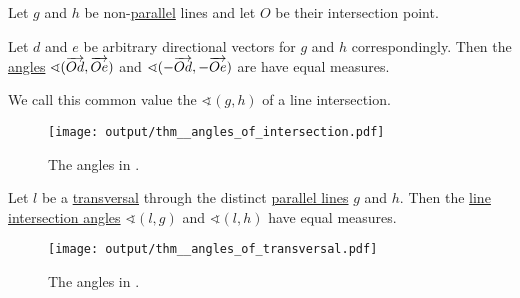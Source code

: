 \begin{definition}\label{thm:angles_of_intersection}
  Let \( g \) and \( h \) be non-\hyperref[def:affine_parallelism]{parallel} lines and let \( O \) be their intersection point.

  Let \( d \) and \( e \) be arbitrary directional vectors for \( g \) and \( h \) correspondingly. Then the \hyperref[def:angle/undirected]{ angles} \( \sphericalangle(\overrightarrow{Od}, \overrightarrow{Oe}) \) and \( \sphericalangle(-\overrightarrow{Od}, -\overrightarrow{Oe}) \) are have equal measures.

  We call this common value the  \( \sphericalangle(g, h) \) of a line intersection.

  \begin{figure}[!ht]
    \centering
    \texttt{[image: output/thm\_\_angles\_of\_intersection.pdf]}
    \caption{The angles in .}\label{fig:thm:angles_of_intersection}
  \end{figure}
\end{definition}

\begin{definition}\label{thm:angles_of_transversal}
  Let \( l \) be a \hyperref[def:transversal_line]{transversal} through the distinct \hyperref[def:affine_parallelism]{parallel lines} \( g \) and \( h \). Then the \hyperref[thm:angles_of_intersection]{line intersection angles} \( \sphericalangle(l, g) \) and \( \sphericalangle(l, h) \) have equal measures.

  \begin{figure}[!ht]
    \centering
    \texttt{[image: output/thm\_\_angles\_of\_transversal.pdf]}
    \caption{The angles in .}\label{fig:thm:angles_of_transversal}
  \end{figure}
\end{definition}


